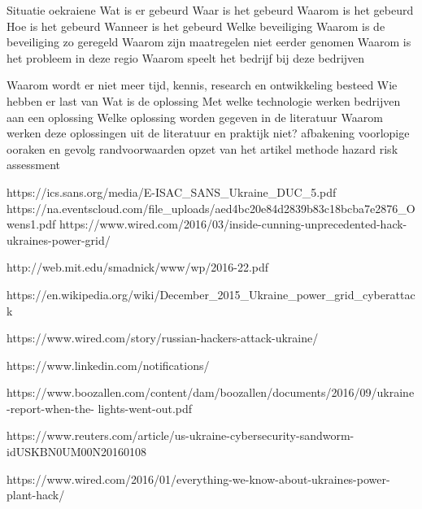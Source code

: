 Situatie oekraiene
Wat is er gebeurd
Waar is het gebeurd
Waarom is het gebeurd
Hoe is het gebeurd
Wanneer is het gebeurd
Welke beveiliging
Waarom is de beveiliging zo geregeld
Waarom zijn maatregelen niet eerder genomen
Waarom is het probleem in deze regio
Waarom speelt het bedrijf bij deze bedrijven



Waarom wordt er niet meer tijd, kennis, research en ontwikkeling besteed
Wie hebben er last van
Wat is de oplossing
Met welke technologie werken bedrijven aan een oplossing
Welke oplossing worden gegeven in de literatuur
Waarom werken deze oplossingen uit de literatuur en praktijk niet?
afbakening
voorlopige ooraken en gevolg
randvoorwaarden
opzet van het artikel
methode hazard risk assessment




https://ics.sans.org/media/E-ISAC_SANS_Ukraine_DUC_5.pdf
https://na.eventscloud.com/file_uploads/aed4bc20e84d2839b83c18bcba7e2876_Owens1.pdf
https://www.wired.com/2016/03/inside-cunning-unprecedented-hack-ukraines-power-grid/

http://web.mit.edu/smadnick/www/wp/2016-22.pdf

https://en.wikipedia.org/wiki/December_2015_Ukraine_power_grid_cyberattack

https://www.wired.com/story/russian-hackers-attack-ukraine/

https://www.linkedin.com/notifications/

https://www.boozallen.com/content/dam/boozallen/documents/2016/09/ukraine-report-when-the-
lights-went-out.pdf

https://www.reuters.com/article/us-ukraine-cybersecurity-sandworm-idUSKBN0UM00N20160108

https://www.wired.com/2016/01/everything-we-know-about-ukraines-power-plant-hack/

